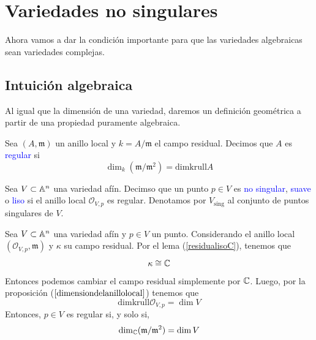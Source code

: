 \section{Variedades no singulares}

Ahora vamos a dar la condición importante para que las variedades algebraicas sean variedades complejas.

\subsection{Intuición algebraica}
    Al igual que la dimensión de una variedad, daremos un definición geométrica a partir de una propiedad puramente algebraica.

\begin{definition}
    Sea $(A,\mathfrak{m})$ un anillo local y $k=A/\mathfrak{m}$ el campo residual. Decimos que $A$ es \textcolor{blue}{regular} si
    \begin{equation*}
        \dim_k(\mathfrak{m}/\mathfrak{m}^2)=\mathrm{dimkrull}A
    \end{equation*}
\end{definition}

\begin{definition}
    Sea $V\subset\mathbb{A}^n$ una variedad afín. Decimso que un punto $p\in V$ es \textcolor{blue}{no singular}, \textcolor{blue}{suave} o \textcolor{blue}{liso} si el anillo local $\mathcal{O}_{V,p}$ es regular.
    Denotamos por $V_{\text{sing}}$ al conjunto de puntos singulares de $V$.
\end{definition}

\begin{remark}
    Sea $V\subset\mathbb{A}^n$ una variedad afín y $p\in V$ un punto. Considerando el anillo local $(\mathcal{O}_{V,p},\mathfrak{m})$ y $\kappa$ su campo residual. Por el lema (\ref{residualisoC}), tenemos que
    \begin{equation*}
        \kappa\cong \mathbb{C}
    \end{equation*}
    Entonces podemos cambiar el campo residual simplemente por $\mathbb{C}$. Luego, por la proposición ($\ref{dimensiondelanillolocal}$) tenemos que 
    \begin{equation*}
        \mathrm{dimkrull}\mathcal{O}_{V,p}=\dim V
    \end{equation*}
    Entonces, $p\in V$ es regular si, y solo si,
    \begin{equation*}
        \dim_{\mathbb{C}}(\mathfrak{m}/\mathfrak{m}^2)=\dim V
    \end{equation*}
\end{remark}


